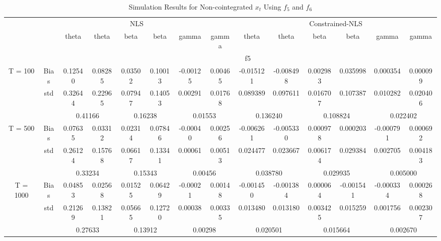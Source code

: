 \documentclass[a4paper,12pt,times,numbered,print,index]{report}
\numberwithin{equation}{section}
\begin{document}
\begin{table}[htbp]
	\centering
	\caption{Simulation Results for Non-cointegrated $x_t$ Using $f_5$ and $f_6$}
	\begin{adjustbox}{max width=\textwidth}
	\begin{tabular}{cccccccccccccc}
		\toprule
		& \multicolumn{7}{c}{NLS}                               & \multicolumn{6}{c}{Constrained-NLS} \\
		&       & theta & theta & beta  & beta  & gamma & gamma & theta & theta & beta  & beta  & gamma & gamma \\
		\midrule
		&       & \multicolumn{12}{c}{f5} \\
		T = 100 & Bias  & 0.12540 & 0.08285 & 0.03502 & 0.10013 & \textcolor[rgb]{ 0,  .439,  .753}{-0.00125} & 0.00465 & -0.015121 & -0.008498 & 0.002983 & 0.035998 & \textcolor[rgb]{ 0,  .439,  .753}{0.000354} & 0.000099 \\
		& std   & 0.32644 & 0.22965 & 0.07947 & 0.14053 & 0.00291 & 0.01768 & 0.089389 & 0.097611 & 0.016707 & 0.107387 & 0.010282 & 0.020406 \\
		&       & \multicolumn{2}{c}{0.41166} & \multicolumn{2}{c}{0.16238} & \multicolumn{2}{c}{0.01553} & \multicolumn{2}{c}{0.136240} & \multicolumn{2}{c}{0.108824} & \multicolumn{2}{c}{0.022402} \\
		\multirow{3}[0]{*}{T = 500} & Bias  & 0.07635 & 0.03312 & 0.02314 & 0.07846 & \textcolor[rgb]{ 0,  .439,  .753}{-0.00040} & 0.00256 & -0.006261 & -0.005330 & 0.000978 & 0.000203 & \textcolor[rgb]{ 0,  .439,  .753}{-0.000791} & 0.000692 \\
		& std   & 0.26124 & 0.15768 & 0.06617 & 0.13341 & 0.00061 & 0.00513 & 0.024477 & 0.023667 & 0.006174 & 0.029384 & 0.002705 & 0.004183 \\
		&       & \multicolumn{2}{c}{0.33234} & \multicolumn{2}{c}{0.15343} & \multicolumn{2}{c}{0.00456} & \multicolumn{2}{c}{0.038780} & \multicolumn{2}{c}{0.029935} & \multicolumn{2}{c}{0.005000} \\
		\multirow{3}[1]{*}{T = 1000} & Bias  & 0.04853 & 0.02568 & 0.01525 & 0.06429 & \textcolor[rgb]{ 0,  .439,  .753}{-0.00021} & 0.00148 & -0.001450 & -0.001384 & 0.000064 & -0.001541 & \textcolor[rgb]{ 0,  .439,  .753}{-0.000334} & 0.000268 \\
		& std   & 0.21269 & 0.13821 & 0.05665 & 0.12720 & 0.00038 & 0.00335 & 0.013480 & 0.013180 & 0.003425 & 0.015259 & 0.001756 & 0.002307 \\
		&       & \multicolumn{2}{c}{0.27633} & \multicolumn{2}{c}{0.13912} & \multicolumn{2}{c}{0.00298} & \multicolumn{2}{c}{0.020501} & \multicolumn{2}{c}{0.015664} & \multicolumn{2}{c}{0.002670} \\

\end{tabular}
\end{adjustbox}
\end{table}
\end{document}
